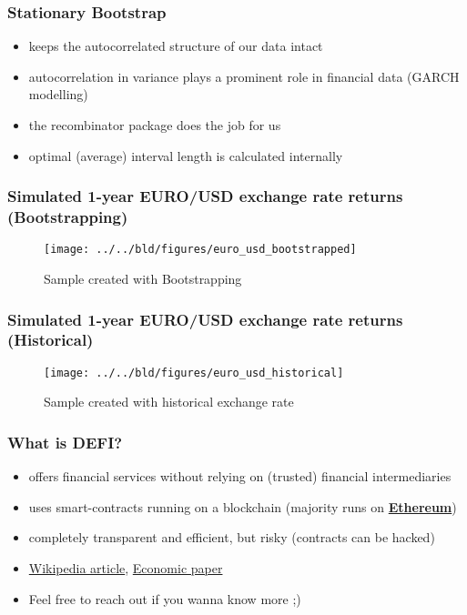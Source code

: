 \documentclass[11pt]{beamer}
\begin{document}
\begin{frame}[t]
    \frametitle{Stationary Bootstrap}
    \begin{itemize}
        \item keeps the autocorrelated structure of our data intact
        \item autocorrelation in variance plays a prominent role in financial data (GARCH modelling)
        \item the recombinator package does the job for us
        \item optimal (average) interval length is calculated internally
    \end{itemize}
    \note{~}
\end{frame}

\begin{frame}[t]
    \frametitle{Simulated 1-year EURO/USD exchange rate returns (Bootstrapping)}
    \begin{figure}
        \caption{Sample created with Bootstrapping}
        \texttt{[image: ../../bld/figures/euro\_usd\_bootstrapped]}
    \end{figure}
\end{frame}

\begin{frame}[t]
    \frametitle{Simulated 1-year EURO/USD exchange rate returns (Historical)}
    \begin{figure}
        \caption{Sample created with historical exchange rate}
        \texttt{[image: ../../bld/figures/euro\_usd\_historical]}
    \end{figure}
\end{frame}

\begin{frame}[t]
    \frametitle{What is DEFI?}
    \begin{itemize}
        \item offers financial services without relying on (trusted) financial intermediaries
        \item uses smart-contracts running on a blockchain (majority runs on \href{https://ethereum.org/en/}{\bf{Ethereum}})
        \item completely transparent and efficient, but risky (contracts can be hacked)
        \item \href{https://en.wikipedia.org/wiki/Decentralized_finance}{Wikipedia article}, \href{https://research.stlouisfed.org/publications/review/2021/02/05/decentralized-finance-on-blockchain-and-smart-contract-based-financial-markets}{Economic paper}
        \item Feel free to reach out if you wanna know more ;)
    \end{itemize}
    \note{~}
\end{frame}
\end{document}
